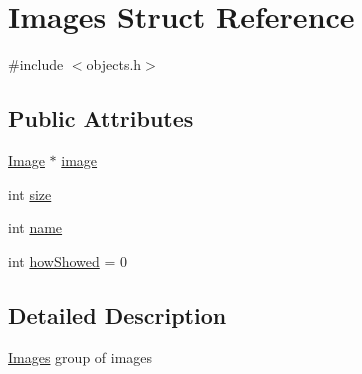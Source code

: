 \hypertarget{struct_images}{\section{Images Struct Reference}
\label{struct_images}
}


{\ttfamily \#include $<$objects.\-h$>$}

\subsection*{Public Attributes}
\begin{DoxyCompactItemize}
\item 
\hyperlink{struct_image}{Image} $\ast$ \hyperlink{struct_images_ac66f81236ef2f8c420fb5a5c79a76997}{image}
\item 
int \hyperlink{struct_images_a9f51a012085149e8102280a76b10bab4}{size}
\item 
int \hyperlink{struct_images_a269ac7a7104440dfd4a9dc8e94b81491}{name}
\item 
int \hyperlink{struct_images_a6904c7d8163adb2cc2a841f725875de9}{how\-Showed} = 0
\end{DoxyCompactItemize}


\subsection{Detailed Description}
\hyperlink{struct_images}{Images} group of images 

